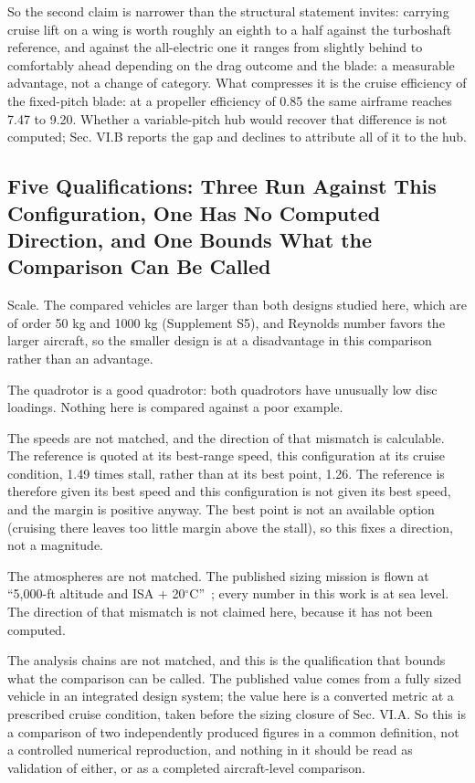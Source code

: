 \documentclass[journal]{new-aiaa}
\begin{document}
So the second claim is narrower than the structural statement invites: carrying cruise lift on a wing is worth roughly an eighth to a half against the turboshaft reference, and against the all-electric one it ranges from slightly behind to comfortably ahead depending on the drag outcome and the blade: a measurable advantage, not a change of category. What compresses it is the cruise efficiency of the fixed-pitch blade: at a propeller efficiency of 0.85 the same airframe reaches 7.47 to 9.20. Whether a variable-pitch hub would recover that difference is not computed; Sec. VI.B reports the gap and declines to attribute all of it to the hub.

\subsection{Five Qualifications: Three Run Against This Configuration, One Has No Computed Direction, and One Bounds What the Comparison Can Be Called}

Scale. The compared vehicles are larger than both designs studied here, which are of order 50 kg and 1000 kg (Supplement S5), and Reynolds number favors the larger aircraft, so the smaller design is at a disadvantage in this comparison rather than an advantage.

The quadrotor is a good quadrotor: both quadrotors have unusually low disc loadings. Nothing here is compared against a poor example.

The speeds are not matched, and the direction of that mismatch is calculable. The reference is quoted at its best-range speed, this configuration at its cruise condition, 1.49 times stall, rather than at its best point, 1.26. The reference is therefore given its best speed and this configuration is not given its best speed, and the margin is positive anyway. The best point is not an available option (cruising there leaves too little margin above the stall), so this fixes a direction, not a magnitude.

The atmospheres are not matched. The published sizing mission is flown at ``5,000-ft altitude and ISA + 20$^\circ$C''~\cite{r16}; every number in this work is at sea level. The direction of that mismatch is not claimed here, because it has not been computed.

The analysis chains are not matched, and this is the qualification that bounds what the comparison can be called. The published value comes from a fully sized vehicle in an integrated design system; the value here is a converted metric at a prescribed cruise condition, taken before the sizing closure of Sec. VI.A. So this is a comparison of two independently produced figures in a common definition, not a controlled numerical reproduction, and nothing in it should be read as validation of either, or as a completed aircraft-level comparison.
\end{document}
